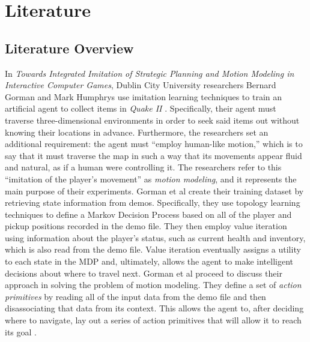 \chapter{Literature}
\label{ch:Literature}



\section{Literature Overview}

In {\it Towards Integrated Imitation of Strategic Planning and Motion Modeling in Interactive Computer Games}, Dublin City University researchers Bernard Gorman and Mark Humphrys use imitation learning techniques to train an artificial agent to collect items in {\it Quake II} \cite{Gorman:2006}. Specifically, their agent must traverse three-dimensional environments in order to seek said items out without knowing their locations in advance. Furthermore, the researchers set an additional requirement: the agent must ``employ human-like motion,'' which is to say that it must traverse the map in such a way that its movements appear fluid and natural, as if a human were controlling it. The researchers refer to this ``imitation of the player's movement'' as {\it motion modeling}, and it represents the main purpose of their experiments. Gorman et al create their training dataset by retrieving state information from demos. Specifically, they use topology learning techniques to define a Markov Decision Process based on all of the player and pickup positions recorded in the demo file. They then employ value iteration using information about the player's status, such as current health and inventory, which is also read from the demo file. Value iteration eventually assigns a utility to each state in the MDP and, ultimately, allows the agent to make intelligent decisions about where to travel next. Gorman et al proceed to discuss their approach in solving the problem of motion modeling. They define a set of {\it action primitives} by reading all of the input data from the demo file and then disassociating that data from its context. This allows the agent to, after deciding where to navigate, lay out a series of action primitives that will allow it to reach its goal \cite{Gorman:2006}.

